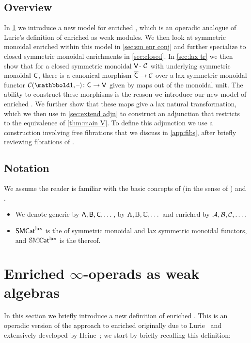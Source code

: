 \documentclass[a4paper,11pt]{article}
\begin{document}
\subsection*{Overview}

In \cref{sec:enr weak alg} we introduce a new model for enriched
\iopds{}, which is an operadic analogue of Lurie's definition of
enriched \icats{} as weak modules. We then look at symmetric monoidal
enriched \icats{} within this model in \cref{sec:sm enr conj} and
further specialize to closed symmetric monoidal enrichments in
\cref{sec:closed}. In \cref{sec:lax tr} we then show that for a closed
symmetric monoidal $\textup{\textsf{V}}$-\icat{} $\mathcal{C}$ with underlying symmetric
monoidal \icat{} $\textup{\textsf{C}}$, there is a canonical morphism
$\overline{\oC} \to \eC$ over a lax symmetric monoidal functor
$\eC(\bbone, \blank) \colon \oC \to \oV$ given by maps out of the
monoidal unit. The ability to construct these morphisms is the reason we
introduce our new model of enriched \iopds{}. We further show that
these maps give a lax natural transformation, which we then use in
\cref{sec:extend adjn} to construct an adjunction that restricts to
the equivalence of \cref{thm:main V}. To define this adjunction we use
a construction involving free fibrations that we discuss in
\cref{app:fibs}, after briefly reviewing fibrations of \itcats{}.


\subsection*{Notation}
We assume the reader is familiar with the basic concepts of \iopds{}
(in the sense of \cite{HA}) and \itcats{}.

\begin{itemize}
\item We denote generic \icats{} by $\textup{\textsf{A}}, \textup{\textsf{B}}, \textup{\textsf{C}}, \dots$, \itcats{}
  by $\mathbb{A}, \mathbb{B}, \mathbb{C}, \dots$ and
  enriched \icats{} by $\mathcal{A}, \mathcal{B}, \mathcal{C}, \dots$.
\item $\textup{\textsf{SMCat}}^{\text{\textup{lax}}}$ is the \icat{} of symmetric
  monoidal \icats{} and lax symmetric monoidal functors, and $\mathbb{SMC}\mkern-0.5mu\textsf{\textup{at}}^{\text{\textup{lax}}}$
  is the \itcat{} thereof.
\end{itemize}



\section{Enriched $\infty$-operads as weak algebras}
\label{sec:enr weak alg}

In this section we briefly introduce a new definition of enriched
\iopds{}. This is an operadic version of the approach to enriched
\icats{} originally due to Lurie~\cite[\S 4.7.1]{HA} and extensively developed by
Heine~\cite{HeineEnr,HeineBienr,HeineColim}; we start by briefly
recalling this definition:
\end{document}
